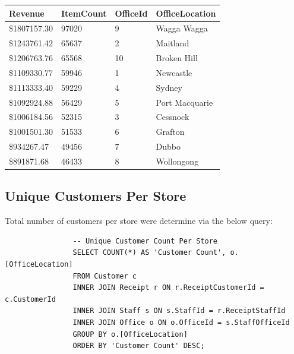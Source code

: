 \documentclass{article}
\begin{document}
                \begin{table}[H]
                    \centering
                    \begin{tabular}{|l|l|l|l|}
                    \hline
                    Revenue       & ItemCount & OfficeId & OfficeLocation \\ \hline
                    \$1807157.30 & 97020     & 9        & Wagga Wagga    \\ \hline
                    \$1243761.42 & 65637     & 2        & Maitland       \\ \hline
                    \$1206763.76 & 65568     & 10       & Broken Hill    \\ \hline
                    \$1109330.77 & 59946     & 1        & Newcastle      \\ \hline
                    \$1113333.40 & 59229     & 4        & Sydney         \\ \hline
                    \$1092924.88 & 56429     & 5        & Port Macquarie \\ \hline
                    \$1006184.56 & 52315     & 3        & Cessnock       \\ \hline
                    \$1001501.30 & 51533     & 6        & Grafton        \\ \hline
                    \$934267.47  & 49456     & 7        & Dubbo          \\ \hline
                    \$891871.68  & 46433     & 8        & Wollongong     \\ \hline
                    \end{tabular}
                \end{table}

\newpage

            \subsection{Unique Customers Per Store}
                
            Total number of customers per store were determine via the below query: \\

            \begin{lstlisting}
                -- Unique Customer Count Per Store
                SELECT COUNT(*) AS 'Customer Count', o.[OfficeLocation]
                FROM Customer c
                INNER JOIN Receipt r ON r.ReceiptCustomerId = c.CustomerId
                INNER JOIN Staff s ON s.StaffId = r.ReceiptStaffId
                INNER JOIN Office o ON o.OfficeId = s.StaffOfficeId
                GROUP BY o.[OfficeLocation]
                ORDER BY 'Customer Count' DESC;
            \end{lstlisting}
\end{document}
